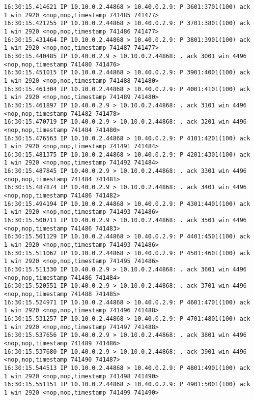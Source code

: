 \documentclass[a4paper,12pt]{article}
\begin{document}
\begin{Verbatim}
16:30:15.414621 IP 10.10.0.2.44868 > 10.40.0.2.9: P 3601:3701(100) ack 1 win 2920 <nop,nop,timestamp 741485 741477>
16:30:15.421255 IP 10.10.0.2.44868 > 10.40.0.2.9: P 3701:3801(100) ack 1 win 2920 <nop,nop,timestamp 741486 741477>
16:30:15.431464 IP 10.10.0.2.44868 > 10.40.0.2.9: P 3801:3901(100) ack 1 win 2920 <nop,nop,timestamp 741487 741477>
16:30:15.440485 IP 10.40.0.2.9 > 10.10.0.2.44868: . ack 3001 win 4496 <nop,nop,timestamp 741480 741476>
16:30:15.451015 IP 10.10.0.2.44868 > 10.40.0.2.9: P 3901:4001(100) ack 1 win 2920 <nop,nop,timestamp 741488 741480>
16:30:15.461304 IP 10.10.0.2.44868 > 10.40.0.2.9: P 4001:4101(100) ack 1 win 2920 <nop,nop,timestamp 741489 741480>
16:30:15.461897 IP 10.40.0.2.9 > 10.10.0.2.44868: . ack 3101 win 4496 <nop,nop,timestamp 741482 741478>
16:30:15.470719 IP 10.40.0.2.9 > 10.10.0.2.44868: . ack 3201 win 4496 <nop,nop,timestamp 741484 741480>
16:30:15.476563 IP 10.10.0.2.44868 > 10.40.0.2.9: P 4101:4201(100) ack 1 win 2920 <nop,nop,timestamp 741491 741484>
16:30:15.481375 IP 10.10.0.2.44868 > 10.40.0.2.9: P 4201:4301(100) ack 1 win 2920 <nop,nop,timestamp 741492 741484>
16:30:15.487845 IP 10.40.0.2.9 > 10.10.0.2.44868: . ack 3301 win 4496 <nop,nop,timestamp 741484 741481>
16:30:15.487874 IP 10.40.0.2.9 > 10.10.0.2.44868: . ack 3401 win 4496 <nop,nop,timestamp 741486 741482>
16:30:15.494194 IP 10.10.0.2.44868 > 10.40.0.2.9: P 4301:4401(100) ack 1 win 2920 <nop,nop,timestamp 741493 741486>
16:30:15.500711 IP 10.40.0.2.9 > 10.10.0.2.44868: . ack 3501 win 4496 <nop,nop,timestamp 741486 741483>
16:30:15.501129 IP 10.10.0.2.44868 > 10.40.0.2.9: P 4401:4501(100) ack 1 win 2920 <nop,nop,timestamp 741493 741486>
16:30:15.511062 IP 10.10.0.2.44868 > 10.40.0.2.9: P 4501:4601(100) ack 1 win 2920 <nop,nop,timestamp 741495 741486>
16:30:15.511330 IP 10.40.0.2.9 > 10.10.0.2.44868: . ack 3601 win 4496 <nop,nop,timestamp 741486 741484>
16:30:15.520551 IP 10.40.0.2.9 > 10.10.0.2.44868: . ack 3701 win 4496 <nop,nop,timestamp 741488 741485>
16:30:15.524971 IP 10.10.0.2.44868 > 10.40.0.2.9: P 4601:4701(100) ack 1 win 2920 <nop,nop,timestamp 741496 741488>
16:30:15.531257 IP 10.10.0.2.44868 > 10.40.0.2.9: P 4701:4801(100) ack 1 win 2920 <nop,nop,timestamp 741497 741488>
16:30:15.537656 IP 10.40.0.2.9 > 10.10.0.2.44868: . ack 3801 win 4496 <nop,nop,timestamp 741489 741486>
16:30:15.537680 IP 10.40.0.2.9 > 10.10.0.2.44868: . ack 3901 win 4496 <nop,nop,timestamp 741490 741487>
16:30:15.544513 IP 10.10.0.2.44868 > 10.40.0.2.9: P 4801:4901(100) ack 1 win 2920 <nop,nop,timestamp 741498 741490>
16:30:15.551151 IP 10.10.0.2.44868 > 10.40.0.2.9: P 4901:5001(100) ack 1 win 2920 <nop,nop,timestamp 741499 741490>

\end{Verbatim}
\end{document}
